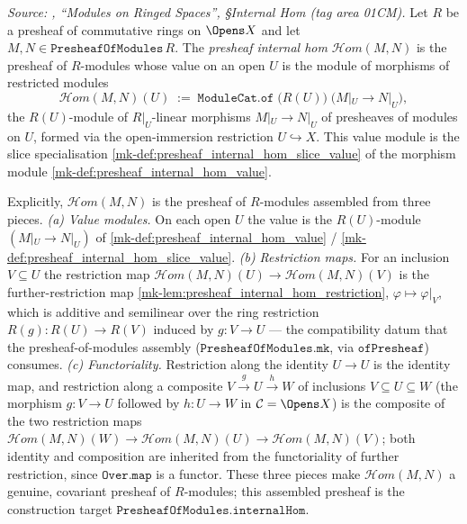 \begin{definition}\label{mk-def:presheaf_internal_hom}
  \leanok

  \textit{Source: \cite{stacks-project}, ``Modules on Ringed Spaces'', \S Internal Hom
  (tag area 01CM).}
  Let \(R\) be a presheaf of commutative rings on \(\Opens X\) and let
  \(M, N \in \mathtt{PresheafOfModules}\,R\). The \emph{presheaf internal hom}
  \(\mathcal{H}om(M, N)\) is the presheaf of \(R\)-modules whose value on an open
  \(U\) is the module of morphisms of restricted modules
  \[
    \mathcal{H}om(M, N)(U)
      \;:=\;
    \mathtt{ModuleCat.of}\;\bigl(R(U)\bigr)\;\bigl(M|_U \longrightarrow N|_U\bigr),
  \]
  the \(R(U)\)-module of \(R|_U\)-linear morphisms \(M|_U \to N|_U\) of presheaves of
  modules on \(U\), formed via the open-immersion restriction \(U \hookrightarrow X\).
  This value module is the slice specialisation
  \ref{mk-def:presheaf_internal_hom_slice_value} of the morphism module
  \ref{mk-def:presheaf_internal_hom_value}.

  Explicitly, \(\mathcal{H}om(M, N)\) is the presheaf of \(R\)-modules assembled from
  three pieces. \emph{(a) Value modules.} On each open \(U\) the value is the
  \(R(U)\)-module \((M|_U \to N|_U)\) of \ref{mk-def:presheaf_internal_hom_value} /
  \ref{mk-def:presheaf_internal_hom_slice_value}. \emph{(b) Restriction maps.} For an
  inclusion \(V \subseteq U\) the restriction map
  \(\mathcal{H}om(M, N)(U) \to \mathcal{H}om(M, N)(V)\) is the further-restriction map
  \ref{mk-lem:presheaf_internal_hom_restriction}, \(\varphi \mapsto \varphi|_V\), which
  is additive and semilinear over the ring restriction \(R(g) : R(U) \to R(V)\)
  induced by \(g : V \to U\) --- the compatibility datum that the presheaf-of-modules
  assembly (\(\mathtt{PresheafOfModules.mk}\), via \(\mathtt{ofPresheaf}\)) consumes.
  \emph{(c) Functoriality.} Restriction along the identity \(U \to U\) is the identity
  map, and restriction along a composite \(V \xrightarrow{g} U \xrightarrow{h} W\) of
  inclusions \(V \subseteq U \subseteq W\) (the morphism \(g : V \to U\) followed by
  \(h : U \to W\) in \(\mathcal{C} = \Opens X\)) is the composite of the two
  restriction maps \(\mathcal{H}om(M,N)(W) \to \mathcal{H}om(M,N)(U) \to
  \mathcal{H}om(M,N)(V)\); both identity and composition are inherited from the
  functoriality of further restriction, since \(\mathtt{Over.map}\) is a functor. These three pieces
  make \(\mathcal{H}om(M, N)\) a genuine, covariant presheaf of \(R\)-modules; this
  assembled presheaf is the construction target \(\mathtt{PresheafOfModules.internalHom}\).


\end{definition}
